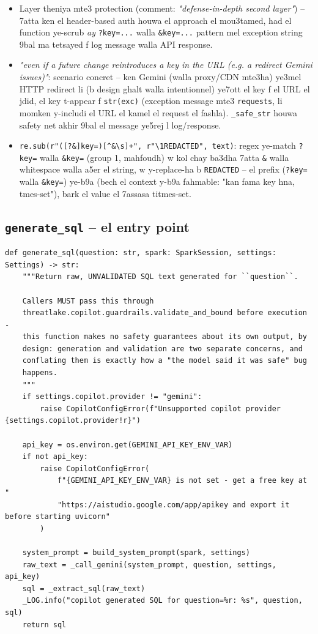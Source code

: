 \documentclass[11pt,a4paper]{report}
\DeclareRobustCommand{\code}[1]{\texttt{#1}}
\begin{document}
\begin{itemize}
  \item Layer theniya mte3 protection (comment: \emph{"defense-in-depth
        second layer"}) -- 7atta ken el header-based auth houwa el
        approach el mou3tamed, had el function ye-scrub \emph{ay}
        \code{?key=...} walla \code{\&key=...} pattern mel exception
        string 9bal ma tetsayed f log message walla API response.
  \item \emph{"even if a future change reintroduces a key in the URL
        (e.g. a redirect Gemini issues)"}: scenario concret -- ken
        Gemini (walla proxy/CDN mte3ha) ye3mel HTTP redirect li
        (b design ghalt walla intentionnel) ye7ott el key f el URL el
        jdid, el key t-appear f \code{str(exc)} (exception message mte3
        \code{requests}, li momken y-includi el URL el kamel el request
        el fashla). \code{\_safe\_str} houwa safety net akhir 9bal el
        message ye5rej l log/response.
  \item \verb|re.sub(r"([?&]key=)[^&\s]+", r"\1REDACTED", text)|:
        regex ye-match \verb|?key=| walla \verb|&key=| (group 1, mahfoudh)
        w kol chay ba3dha 7atta \verb|&| walla whitespace walla a5er
        el string, w y-replace-ha b \code{REDACTED} -- el prefix
        (\verb|?key=| walla \verb|&key=|) ye-b9a (bech el context
        y-b9a fahmable: "kan fama key hna, tmes-set"), bark el value
        el 7assasa titmes-set.
\end{itemize}

\subsection{\code{generate\_sql} -- el entry point}

\begin{lstlisting}[style=pystyle]
def generate_sql(question: str, spark: SparkSession, settings: Settings) -> str:
    """Return raw, UNVALIDATED SQL text generated for ``question``.

    Callers MUST pass this through
    threatlake.copilot.guardrails.validate_and_bound before execution -
    this function makes no safety guarantees about its own output, by
    design: generation and validation are two separate concerns, and
    conflating them is exactly how a "the model said it was safe" bug
    happens.
    """
    if settings.copilot.provider != "gemini":
        raise CopilotConfigError(f"Unsupported copilot provider {settings.copilot.provider!r}")

    api_key = os.environ.get(GEMINI_API_KEY_ENV_VAR)
    if not api_key:
        raise CopilotConfigError(
            f"{GEMINI_API_KEY_ENV_VAR} is not set - get a free key at "
            "https://aistudio.google.com/app/apikey and export it before starting uvicorn"
        )

    system_prompt = build_system_prompt(spark, settings)
    raw_text = _call_gemini(system_prompt, question, settings, api_key)
    sql = _extract_sql(raw_text)
    _LOG.info("copilot generated SQL for question=%r: %s", question, sql)
    return sql
\end{lstlisting}
\end{document}
